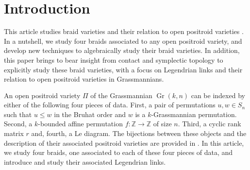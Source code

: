 \documentclass[10pt]{amsart}
\theoremstyle{plain}
\theoremstyle{definition}
\theoremstyle{remark}
\numberwithin{equation}{section}
\newcommand{\Z}{\mathbb{Z}}
\newcommand{\lr}{\longrightarrow}
\DeclareMathOperator{\Gr}{Gr}
\newcommand{\MG}[1]{{\color{teal}{{\bf Misha}: #1}}}
\DeclareRobustCommand{\ateb}{\text{\reflectbox{$\beta$}}}
\begin{document}

\section{Introduction}\label{sec:intro}
This article studies braid varieties \cite{CGGS,Mellit} and their relation to open positroid varieties \cite{KLS}. In a nutshell, we study four braids associated to any open positroid variety, and develop new techniques to algebraically study their braid varieties. %
In addition, this paper brings to bear insight from contact and symplectic topology to explicitly study these braid varieties, with a focus on Legendrian links and their relation to open positroid varieties in Grassmannians.

\noindent An open positroid variety $\Pi$ of the Grassmannian $\Gr(k,n)$ can be indexed by either of the following four pieces of data. First, a pair of permutations $u,w\in S_n$ such that $u\leq w$ in the Bruhat order and $w$ is a $k$-Grassmannian permutation. Second, a $k$-bounded affine permutation $f:\Z\lr\Z$ of size $n$. %
Third, a cyclic rank matrix $r$ and, fourth, a Le diagram. The bijections between these objects and the description of their associated positroid varieties are provided in \cite{KLS, Post}. In this article, we study four braids, one associated to each of these four pieces of data, and introduce and study their associated Legendrian links.
\end{document}
